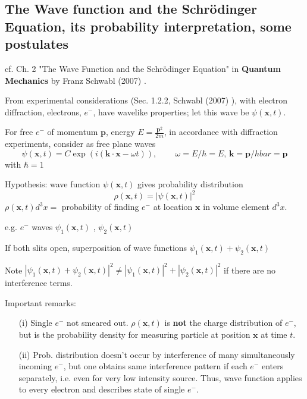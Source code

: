 \documentclass[10pt]{amsart}
\begin{document}
\begin{multicols*}{2}
\section{The Wave function and the Schr\"{o}dinger Equation, its probability interpretation, some postulates}

cf. Ch. 2 "The Wave Function and the Schr\"{o}dinger Equation" in \textbf{Quantum Mechanics} by Franz Schwabl (2007) \cite{FrSc2007}.

From experimental considerations (Sec. 1.2.2, Schwabl (2007) \cite{FrSc2007}), with electron diffraction, electrons, $e^-$, have wavelike properties; let this wave be $\psi(\mathbf{x}, t)$. 

For free $e^-$ of momentum $\mathbf{p}$, energy $E = \frac{ \mathbf{p}^2}{2m}$, in accordance with diffraction experiments, consider as free plane waves 
\[
\psi(\mathbf{x}, t) = C \exp{ \left( i ( \mathbf{k} \cdot \mathbf{x} - \omega t)\right)}, \qquad \, \omega = E / \hbar = E, \, \mathbf{k} = \mathbf{p}/ hbar = \mathbf{p}
\]
with $\hbar = 1$

Hypothesis: wave function $\psi(\mathbf{x},t)$ gives probability distribution 
\[
\rho(\mathbf{x}, t) = | \psi(\mathbf{x}, t)|^2
\]
$\rho(\mathbf{x}, t) d^3 x = $ probability of finding $e^-$ at location $\mathbf{x}$ in volume element $d^3x$.

e.g. $e^-$ waves $\psi_1(\mathbf{x}, t)$ , $\psi_2(\mathbf{x},t)$

If both slits open, superposition of wave functions $\psi_1(\mathbf{x}, t) + \psi_2(\mathbf{x},t)$

Note $| \psi_1(\mathbf{x},t) + \psi_2(\mathbf{x},t) |^2 \neq | \psi_1(\mathbf{x},t) |^2 + |\psi_2(\mathbf{x},t) |^2$ if there are no interference terms.

Important remarks: 

\begin{enumerate}
	\item[(i)] Single $e^-$ not smeared out. $\rho(\mathbf{x},t)$ is \textbf{not} the charge distribution of $e^-$, but is the probability density for measuring particle at position $\mathbf{x}$ at time $t$.
	\item[(ii)] Prob. distribution doesn't occur by interference of many simultaneously incoming $e^-$, but one obtains same interference pattern if each $e^-$ enters separately, i.e. even for very low intensity source. Thus, wave function applies to every electron and describes state of single $e^-$.
\end{enumerate}


\end{multicols*}
\end{document}
